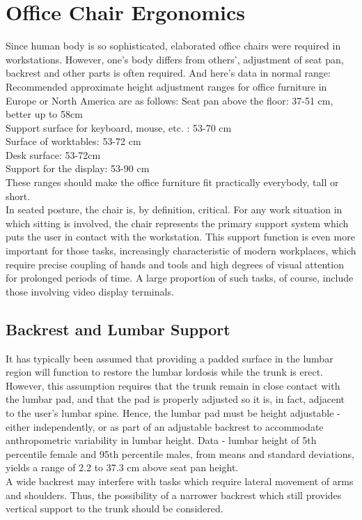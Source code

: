 \documentclass[paper=a4, fontsize=12pt, ]{scrartcl} %
\numberwithin{equation}{section} %
\numberwithin{figure}{section} %
\numberwithin{table}{section} %
\begin{document}
\section{Office Chair Ergonomics}

  Since human body is so sophisticated, elaborated office chairs were required in workstations. However, one's body differs from others', adjustment of seat pan, backrest and other parts is often required. And here's data in normal range:
\\
  Recommended approximate height adjustment ranges for office furniture in Europe or North America are as follows:
Seat pan above the floor: 37-51 cm, better up to 58cm\\
Support surface for keyboard, mouse, etc. : 53-70 cm\\
Surface of worktables: 53-72 cm\\
Desk surface: 53-72cm\\
Support for the display: 53-90 cm\\
These ranges should make the office furniture fit practically everybody, tall or short.
\\

  In seated posture, the chair is, by definition, critical. For any work situation in which sitting is involved, the chair represents the primary support system which puts the user in contact with the workstation. This support function is even more important for those tasks, increasingly characteristic of modern workplaces, which require precise coupling of hands and tools and high degrees of visual attention for prolonged periods of time. A large proportion of such tasks, of course, include those involving video display terminals.

\subsection{Backrest and Lumbar Support}
  It has typically been assumed that providing a padded surface in the lumbar region will function to restore the lumbar lordosis while the trunk is erect. However, this assumption requires that the trunk remain in close contact with the lumbar pad, and that the pad is properly adjusted so it is, in fact, adjacent to the user's lumbar spine. Hence, the lumbar pad must be height adjustable - either independently, or as part of an adjustable backrest to accommodate anthropometric variability in lumbar height. Data - lumbar height of 5th percentile female and 95th percentile males, from means and standard deviations, yields a range of 2.2 to 37.3 cm above seat pan height.
\\
  A wide backrest may interfere with tasks which require lateral movement of arms and shoulders. Thus, the possibility of a narrower backrest which still provides vertical support to the trunk should be considered.
\end{document}
